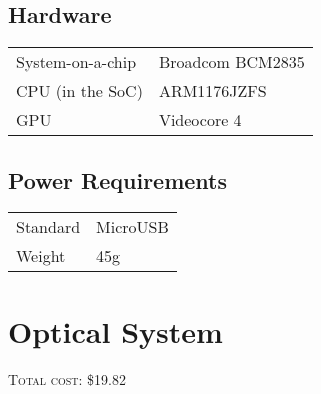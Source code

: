 \subsection{Hardware}

\begin{tabular}{p{} p{}} 
\hline
System-on-a-chip & Broadcom BCM2835 \\
CPU (in the SoC) & ARM1176JZFS \\
GPU & Videocore 4 \\ \hline
\end{tabular}

\subsection{Power Requirements}

\begin{tabular}{p{} p{}}
\hline
Standard & MicroUSB \\
Weight & 45g \\ \hline
\end{tabular}

\section{Optical System}
\nopagebreak
\textsc{Total cost: \$19.82}
